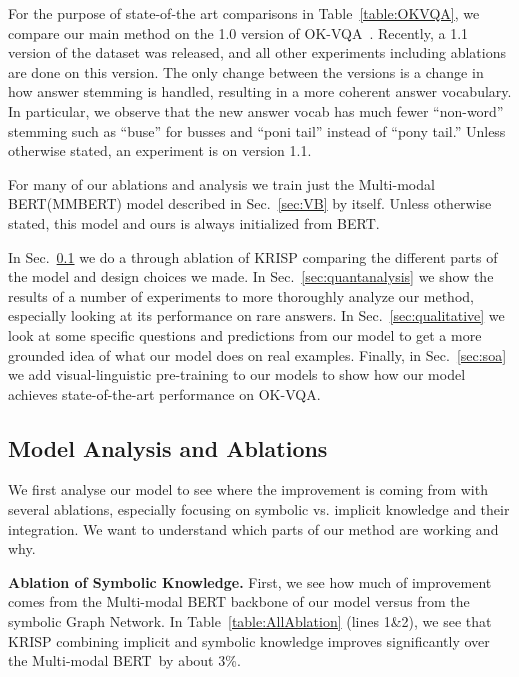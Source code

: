 \documentclass[final]{cvpr}
\providecommand{\ModelName}{KRISP\xspace}
\providecommand{\MMBERTBase}{Multi-modal BERT\xspace}
\providecommand{\MMBERTLong}{Multi-modal BERT\xspace}
\providecommand{\MMBERTAbr}{MMBERT\xspace}
\providecommand{\myparagraph}[1]{\noindent\textbf{#1.}}
\providecommand{\sectionvspace}{\vspace{-0cm}}
\begin{document}
For the purpose of state-of-the art comparisons in Table~\ref{table:OKVQA}, we compare our main method on the 1.0 version of OK-VQA~\cite{marino19cvpr}. Recently, a 1.1 version of the dataset was released, and all other experiments including ablations are done on this version. The only change between the versions is a change in how answer stemming is handled, resulting in a more coherent answer vocabulary. In particular, we observe that the new answer vocab has much fewer ``non-word'' stemming such as ``buse'' for busses and ``poni tail'' instead of ``pony tail.'' Unless otherwise stated, an experiment is on version 1.1.

For many of our ablations and analysis we train just the \MMBERTLong (\MMBERTAbr) model described in Sec.~\ref{sec:VB} by itself. Unless otherwise stated, this model and ours is always initialized from BERT.

In Sec.~\ref{sec:modelanalysis} we do a through ablation of \ModelName comparing the different parts of the model and design choices we made. In Sec.~\ref{sec:quantanalysis} we show the results of a number of experiments to more thoroughly analyze our method, especially looking at its performance on rare answers. In Sec.~\ref{sec:qualitative} we look at some specific questions and predictions from our model to get a more grounded idea of what our model does on real examples. Finally, in Sec.~\ref{sec:soa} we add visual-linguistic pre-training to our models to show how our model achieves state-of-the-art performance on OK-VQA.

\sectionvspace
\subsection{Model Analysis and Ablations}
\label{sec:modelanalysis}
\sectionvspace
We first analyse our model to see where the improvement is coming from with several ablations, especially focusing on symbolic vs. implicit knowledge and their integration. We want to understand which parts of our method are working and why.

\myparagraph{Ablation of Symbolic Knowledge}
First, we see how much of improvement comes from the \MMBERTBase backbone of our model versus from the symbolic Graph Network. In Table~\ref{table:AllAblation} (lines 1\&2),
we see that \ModelName combining implicit and symbolic knowledge improves significantly over the \MMBERTBase~by about 3\%. 
\end{document}
